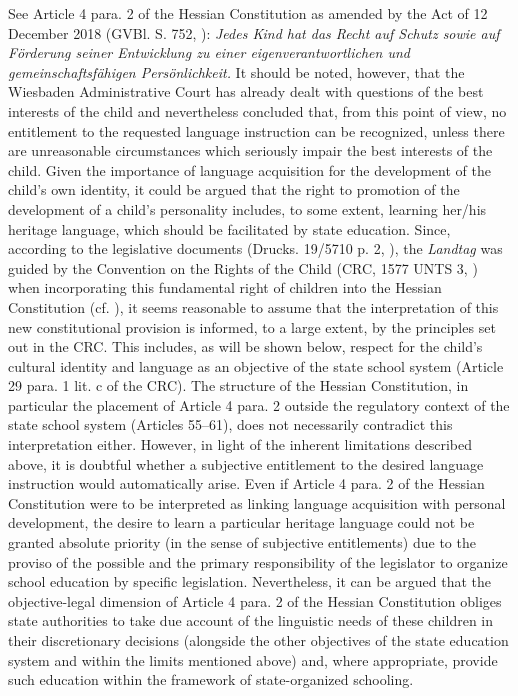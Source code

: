 \documentclass[output=paper,colorlinks,citecolor=brown]{langscibook}
\begin{document}
{See Article 4 para. 2 of the Hessian Constitution as amended by the Act of 12 December 2018 (GVBl. S. 752, \citealt{gvbl2018}): \textit{Jedes Kind hat das Recht auf Schutz sowie auf Förderung seiner Entwicklung zu einer eigenverantwortlichen und gemeinschaftsfähigen Persönlichkeit.} It should be noted, however, that the Wiesbaden Administrative Court has already dealt with questions of the best interests of the child and nevertheless concluded that, from this point of view, no entitlement to the requested language instruction can be recognized, unless there are unreasonable circumstances which seriously impair the best interests of the child.} Given the importance of language acquisition for the development of the child's own identity, it could be argued that the right to promotion of the development of a child's personality includes, to some extent, learning her/his heritage language, which should be facilitated by state education. Since, according to the legislative documents (Drucks. 19/5710 p. 2, \citealt{hesse2017}), the \textit{Landtag} was guided by the Convention on the Rights of the Child (CRC, 1577 UNTS 3, \citealt{un_crc_1989}) when incorporating this fundamental right of children into the Hessian Constitution (cf. \citealt{donath2020}), it seems reasonable to assume that the interpretation of this new constitutional provision is informed, to a large extent, by the principles set out in the CRC. This includes, as will be shown below, respect for the child's cultural identity and language as an objective of the state school system (Article 29 para. 1 lit. c of the CRC). The structure of the Hessian Constitution, in particular the placement of Article 4 para. 2 outside the regulatory context of the state school system (Articles 55--61), does not necessarily contradict this interpretation either. However, in light of the inherent limitations described above, it is doubtful whether a subjective entitlement to the desired language instruction would automatically arise. Even if Article 4 para. 2 of the Hessian Constitution were to be interpreted as linking language acquisition with personal development, the desire to learn a particular heritage language could not be granted absolute priority (in the sense of subjective entitlements) due to the proviso of the possible and the primary responsibility of the legislator to organize school education by specific legislation. Nevertheless, it can be argued that the objective-legal dimension of Article 4 para. 2 of the Hessian Constitution obliges state authorities to take due account of the linguistic needs of these children in their discretionary decisions (alongside the other objectives of the state education system and within the limits mentioned above) and, where appropriate, provide such education within the framework of state-organized schooling.
\end{document}
